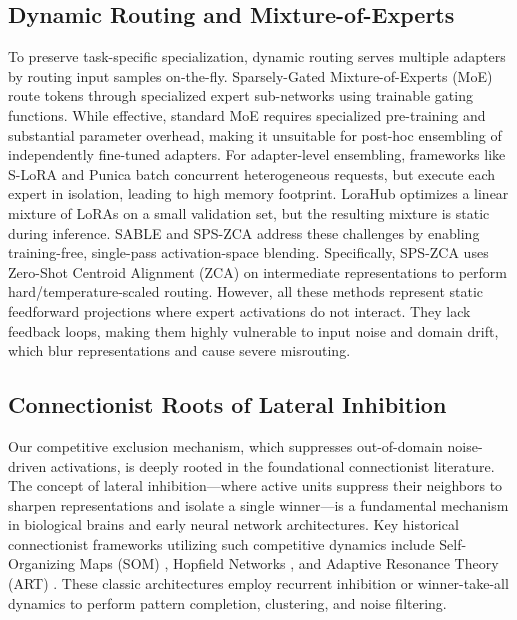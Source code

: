 \subsection{Dynamic Routing and Mixture-of-Experts}
To preserve task-specific specialization, dynamic routing serves multiple adapters by routing input samples on-the-fly. 
Sparsely-Gated Mixture-of-Experts (MoE) \cite{shazeer2017outrageously, fedus2022switch, riquelme2021scaling} route tokens through specialized expert sub-networks using trainable gating functions. 
While effective, standard MoE requires specialized pre-training and substantial parameter overhead, making it unsuitable for post-hoc ensembling of independently fine-tuned adapters.
For adapter-level ensembling, frameworks like S-LoRA \cite{sheng2023slora} and Punica \cite{chen2023punica} batch concurrent heterogeneous requests, but execute each expert in isolation, leading to high memory footprint. 
LoraHub \cite{huang2024lorahub} optimizes a linear mixture of LoRAs on a small validation set, but the resulting mixture is static during inference. 
SABLE and SPS-ZCA address these challenges by enabling training-free, single-pass activation-space blending. 
Specifically, SPS-ZCA uses Zero-Shot Centroid Alignment (ZCA) on intermediate representations to perform hard/temperature-scaled routing. 
However, all these methods represent static feedforward projections where expert activations do not interact. They lack feedback loops, making them highly vulnerable to input noise and domain drift, which blur representations and cause severe misrouting.

\subsection{Connectionist Roots of Lateral Inhibition}
Our competitive exclusion mechanism, which suppresses out-of-domain noise-driven activations, is deeply rooted in the foundational connectionist literature. The concept of lateral inhibition---where active units suppress their neighbors to sharpen representations and isolate a single winner---is a fundamental mechanism in biological brains and early neural network architectures. Key historical connectionist frameworks utilizing such competitive dynamics include Self-Organizing Maps (SOM) \cite{kohonen1982self}, Hopfield Networks \cite{hopfield1982neural}, and Adaptive Resonance Theory (ART) \cite{carpenter1987art}. These classic architectures employ recurrent inhibition or winner-take-all dynamics to perform pattern completion, clustering, and noise filtering. 

